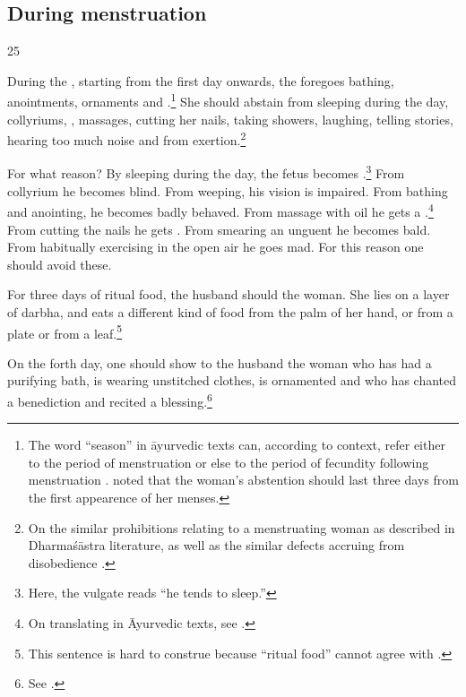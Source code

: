 \begin{translation}
 \subsection{During menstruation}
 
 \item[25]
 
During the , starting from the first day onwards, the
 foregoes bathing, anointments,
ornaments and .\footnote{The word 
    “season” in āyurvedic texts can, according to context, refer either to
    the period of menstruation or else to the period of fecundity
    following menstruation \citep[15\,ff., note 27, \emph{et
    passim}]{das-2003}.  noted that the woman's
    abstention should last three days from the first appearence of her
    menses.} She should abstain from sleeping during the day, collyriums,
    , massages, cutting her nails, taking
    showers, laughing, telling stories, hearing too much noise and from
    exertion.\footnote{On the similar prohibitions relating to a
        menstruating woman as described in Dharmaśāstra literature, as well as
        the similar defects accruing from disobedience         
        \citep[see][284--287]{lesl-1989}.}
        
For what reason?  By sleeping during the day, the fetus becomes
.\footnote{Here, the vulgate reads  “he
    tends to sleep.”} From collyrium he becomes blind.  From weeping, his
    vision is impaired. From bathing and anointing, he becomes badly
    behaved. From massage with oil he gets a .\footnote{On translating  in Āyurvedic texts, see
        \cite[96\,ff]{emme-1984}.} From cutting the nails he gets
        .  From smearing an unguent he becomes bald.
        From habitually exercising in the open air he goes mad. For this
        reason one should avoid these.
    
For three days of ritual food, the husband should  the
woman.  She lies on a layer of \gls{darbha}, and eats a different kind of food
from the palm of her hand, or from a plate or from a leaf.\footnote{This
    sentence is hard to construe because  “ritual food” cannot 
    agree
    with .}

On the forth day, one should  show to the husband the woman 
who has
had a purifying bath, is wearing unstitched clothes, is ornamented and who has
chanted a benediction and recited a blessing.\footnote{See \cite[58 and
    fn.\,167]{wuja-2023}.}
    

\end{translation}
